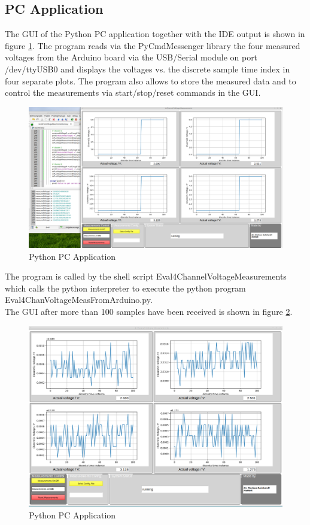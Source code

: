 \documentclass[11pt, oneside]{scrartcl}   	%
\begin{document}
\subsection{PC Application}
The GUI of the Python PC application together with the IDE output is shown in figure \ref{fig:ApplicationWindow}. The program reads via the PyCmdMessenger library the four measured voltages from the Arduino board
via the USB/Serial module on port /dev/ttyUSB0 and displays the voltages vs. the discrete sample time index in four separate plots.
The program also allows to store the measured data and to control the measurements via start/stop/reset commands in the GUI.
\begin{figure}[htbp]
	\centering
	\includegraphics[width=1.0\linewidth]{Figures/ApplicationWindow.png}
	\caption[Python PC Application]{Python PC Application}
	\label{fig:ApplicationWindow}
\end{figure}

The program is called by the shell script Eval4ChannelVoltageMeasurements which calls the python interpreter to execute the python program Eval4ChanVoltageMeasFromArduino.py.\\

The GUI after more than 100 samples have been received is shown in figure \ref{fig:ApplicationWindow1}.
\begin{figure}[htbp]
	\centering
	\includegraphics[width=1.0\linewidth]{Figures/ApplicationWindow1.png}
	\caption[Python PC Application]{Python PC Application}
	\label{fig:ApplicationWindow1}
\end{figure}
\end{document}
